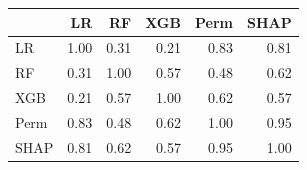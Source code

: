 \footnotesize
\setlength{\tabcolsep}{3pt}
\begin{tabular}{lrrrrr}
\toprule
 & LR & RF & XGB & Perm & SHAP \\
\midrule
LR & 1.00 & 0.31 & 0.21 & 0.83 & 0.81 \\
RF & 0.31 & 1.00 & 0.57 & 0.48 & 0.62 \\
XGB & 0.21 & 0.57 & 1.00 & 0.62 & 0.57 \\
Perm & 0.83 & 0.48 & 0.62 & 1.00 & 0.95 \\
SHAP & 0.81 & 0.62 & 0.57 & 0.95 & 1.00 \\
\bottomrule
\end{tabular}

